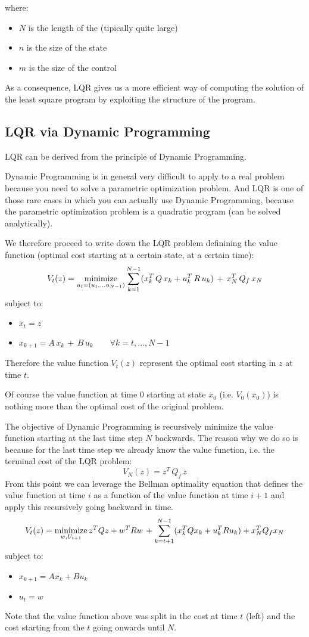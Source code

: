 where:
\begin{itemize}
\item $N$ is the length of the  (tipically quite large)
\item $n$ is the size of the state
\item $m$ is the size of the control
\end{itemize}

As a consequence, LQR gives us a more efficient way of computing the solution of the least square program by exploiting the structure of the program.

\subsection{LQR via Dynamic Programming}
LQR can be derived from the principle of Dynamic Programming.

Dynamic Programming is in general very difficult to apply to a real problem because you need to solve a parametric optimization problem. And LQR is one of those rare cases in which you can actually use Dynamic Programming, because the parametric optimization problem is a quadratic program (can be solved analytically).

We therefore proceed to write down the LQR problem definining the value function (optimal cost starting at a certain state, at a certain time):
\[V_t(z) = \operatorname*{minimize}_{u_t = (u_t,...u_{N-1})} \sum_{k=1}^{N-1}(x_k^T\,Q\,x_k + u_k^T\,R\,u_k)\,+\,x_N^T\,Q_f\,x_N\]
subject to:
\begin{itemize}
\item $x_t = z$
\item $x_{k+1} = A\,x_k\,+\,B\,u_k\qquad\forall k = t, ..., N-1$
\end{itemize}
Therefore the value function $V_t(z)$ represent the optimal cost starting in $z$ at time $t$.

Of course the value function at time $0$ starting at state $x_0$ (i.e. $V_0(x_0)$) is nothing more than the optimal cost of the original problem.

The objective of Dynamic Programming is recursively minimize the value function starting at the last time step $N$ backwards.
The reason why we do so is because for the last time step we already know the value function, i.e. the terminal cost of the LQR problem:
\[V_N(z) = z^T\,Q_f\,z\]
From this point we can leverage the Bellman optimality equation that defines the value function at time $i$ as a function of the value function at time $i+1$ and apply this recursively going backward in time.
\[V_t(z) = \operatorname*{minimize}_{w, U_{t+1}} z^TQz + w^TRw\,+\sum_{k=t+1}^{N-1}(x_k^TQx_k + u_k^TRu_k) + x_N^TQ_fx_N\]
subject to:
\begin{itemize}
\item $x_{k+1}=Ax_k+Bu_k$
\item $u_t = w$
\end{itemize}
Note that the value function above was split in the cost at time $t$ (left) and the cost starting from the $t$ going onwards until $N$.

